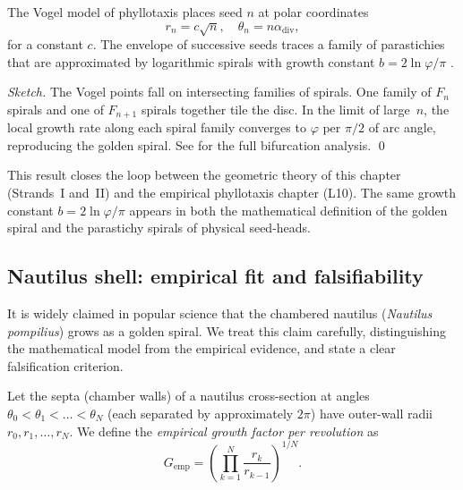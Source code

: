 \begin{proposition}
\label{prop:phyllotaxis}
The Vogel model of phyllotaxis places seed \(n\) at polar
coordinates
\[
  r_n = c\sqrt{n}, \quad \theta_n = n\alpha_{\text{div}},
\]
for a constant \(c\).  The envelope of successive seeds traces
a family of parastichies that are approximated by logarithmic
spirals with growth constant \(b = 2\ln\varphi/\pi\)
\cite{douady_couder_phyllotaxis}.
\end{proposition}

\begin{proof}[Sketch]
The Vogel points fall on intersecting families of spirals.  One
family of \(F_n\) spirals and one of \(F_{n+1}\) spirals together
tile the disc.  In the limit of large~\(n\), the local growth
rate along each spiral family converges to \(\varphi\) per
\(\pi/2\) of arc angle, reproducing the golden spiral.
See \cite{douady_couder_phyllotaxis} for the full bifurcation
analysis.
\qed
\end{proof}

This result closes the loop between the geometric theory of this
chapter (Strands~I and~II) and the empirical phyllotaxis chapter
(L10).  The same growth constant
\(b = 2\ln\varphi/\pi\) appears in both the mathematical
definition of the golden spiral and the parastichy spirals of
physical seed-heads.

\subsection{Nautilus shell: empirical fit and falsifiability}
\label{subsec:17-nautilus}

It is widely claimed in popular science that the chambered
nautilus (\textit{Nautilus pompilius}) grows as a golden spiral.
We treat this claim carefully, distinguishing the mathematical
model from the empirical evidence, and state a clear
falsification criterion.

\begin{definition}
\label{def:nautilus}
Let the septa (chamber walls) of a nautilus cross-section at
angles \(\theta_0 < \theta_1 < \ldots < \theta_N\) (each
separated by approximately \(2\pi\)) have outer-wall
radii \(r_0, r_1, \ldots, r_N\).  We define the
\emph{empirical growth factor per revolution} as
\[
  G_{\text{emp}} = \left(\prod_{k=1}^N \frac{r_k}{r_{k-1}}\right)^{1/N}.
\]
\end{definition}

